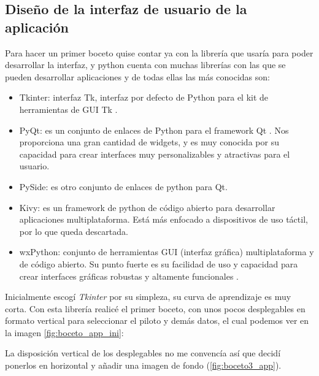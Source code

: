 \subsection{Diseño de la interfaz de usuario de la aplicación}
Para hacer un primer boceto quise contar ya con la librería que usaría para poder desarrollar la interfaz, y python cuenta con muchas librerías con las que se pueden desarrollar aplicaciones y de todas ellas las más conocidas son:
\begin{itemize}
    \item Tkinter: interfaz Tk, interfaz por defecto de Python para el kit de herramientas de GUI Tk \cite{python:tkinter}.
    
    \item PyQt: es un conjunto de enlaces de Python para el framework Qt \cite{riverbankcomputing:pyqt}. Nos proporciona una gran cantidad de widgets, y es  muy conocida por su capacidad para crear interfaces muy personalizables y atractivas para el usuario.

    \item PySide: es otro conjunto de enlaces de python para Qt.
    
    \item Kivy: es un framework de python de código abierto para desarrollar aplicaciones multiplataforma. Está más enfocado a dispositivos de uso táctil, por lo que queda descartada.
    
    \item wxPython: conjunto de herramientas GUI (interfaz gráfica) multiplataforma y de código abierto. Su punto fuerte es su facilidad de uso y capacidad para crear interfaces gráficas robustas y altamente funcionales \cite{wxpython:wxpython}.
\end{itemize}

Inicialmente escogí \textit{Tkinter} por su simpleza, su curva de aprendizaje es muy corta. Con esta librería realicé el primer boceto, con unos pocos desplegables en formato vertical para seleccionar el piloto y demás datos, el cual podemos ver en la imagen \ref{fig:boceto_app_ini}:


La disposición vertical de los desplegables no me convencía así que decidí ponerlos en horizontal y añadir una imagen de fondo (\ref{fig:boceto3_app}).


